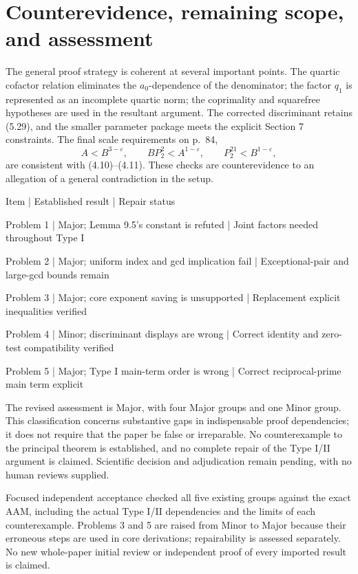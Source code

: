 \documentclass[10pt]{article}
\begin{document}
\section*{Counterevidence, remaining scope, and assessment}
The general proof strategy is coherent at several important points. The quartic cofactor relation eliminates the \(a_0\)-dependence of the denominator; the factor \(q_1\) is represented as an incomplete quartic norm; the coprimality and squarefree hypotheses are used in the resultant argument. The corrected discriminant retains (5.29), and the smaller parameter package meets the explicit Section 7 constraints. The final scale requirements on p. 84, \[A<B^{3-\varepsilon},\qquad BP_2^2<A^{1-\varepsilon},\qquad
 P_2^{21}<B^{1-\varepsilon},\] are consistent with (4.10)–(4.11). These checks are counterevidence to an allegation of a general contradiction in the setup.\par
Item | Established result | Repair status\par
Problem 1 | Major; Lemma 9.5’s constant is refuted | Joint factors needed throughout Type I\par
Problem 2 | Major; uniform index and gcd implication fail | Exceptional-pair and large-gcd bounds remain\par
Problem 3 | Major; core exponent saving is unsupported | Replacement explicit inequalities verified\par
Problem 4 | Minor; discriminant displays are wrong | Correct identity and zero-test compatibility verified\par
Problem 5 | Major; Type I main-term order is wrong | Correct reciprocal-prime main term explicit\par
The revised assessment is Major, with four Major groups and one Minor group. This classification concerns substantive gaps in indispensable proof dependencies; it does not require that the paper be false or irreparable. No counterexample to the principal theorem is established, and no complete repair of the Type I/II argument is claimed. Scientific decision and adjudication remain pending, with no human reviews supplied.\par
Focused independent acceptance checked all five existing groups against the exact AAM, including the actual Type I/II dependencies and the limits of each counterexample. Problems 3 and 5 are raised from Minor to Major because their erroneous steps are used in core derivations; repairability is assessed separately. No new whole-paper initial review or independent proof of every imported result is claimed.\par
\end{document}
